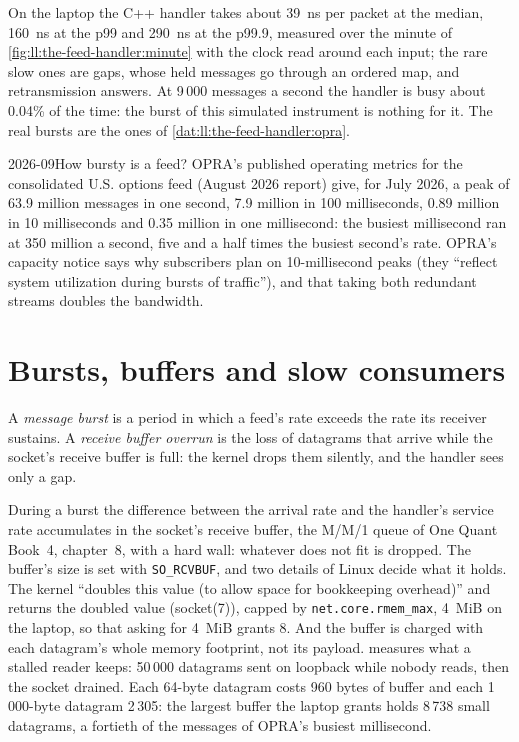On the laptop the C++ handler takes about \qty{39}{\nano\second} per packet at the median, \qty{160}{\nano\second} at the p99
and \qty{290}{\nano\second} at the p99.9, measured over the minute of \cref{fig:ll:the-feed-handler:minute} with the clock read
around each input; the rare slow ones are gaps, whose held messages go through an ordered map, and retransmission answers.
At 9\,000 messages a second the handler is busy about 0.04\% of the time: the burst of this simulated instrument is nothing
for it. The real bursts are the ones of \cref{dat:ll:the-feed-handler:opra}.

\begin{dated}{2026-09}{How bursty is a feed?}\label{dat:ll:the-feed-handler:opra}
OPRA's published operating metrics for the consolidated U.S. options feed (August 2026 report) give, for July 2026, a peak of
63.9 million messages in one second, 7.9 million in 100 milliseconds, 0.89 million in 10 milliseconds and 0.35 million in
one millisecond: the busiest millisecond ran at 350 million a second, five and a half times the busiest second's rate. OPRA's capacity
notice says why subscribers plan on 10-millisecond peaks (they ``reflect system utilization during bursts of traffic''), and
that taking both redundant streams doubles the bandwidth.
\end{dated}

\section{Bursts, buffers and slow consumers}

\begin{definition}\label{def:ll:the-feed-handler:burst}
A \emph{message burst} is a period in which a feed's rate exceeds the rate its receiver sustains. A
\emph{receive buffer overrun} is the loss of datagrams that arrive while the socket's receive
buffer is full: the kernel drops them silently, and the handler sees only a gap.
\end{definition}

During a burst the difference between the arrival rate and the handler's service rate accumulates in the socket's receive
buffer, the M/M/1 queue of One Quant Book~4, chapter~8, with a hard wall: whatever does not fit is dropped. The buffer's
size is set with \texttt{SO\_RCVBUF}, and two details of Linux decide what it holds. The kernel ``doubles this value (to
allow space for bookkeeping overhead)'' and returns the doubled value (socket(7)), capped by \texttt{net.core.rmem\_max},
4~MiB on the laptop, so that asking for 4~MiB grants 8. And the buffer is charged with each datagram's whole memory footprint,
not its payload.  measures what a stalled reader keeps: 50\,000 datagrams sent on
loopback while nobody reads, then the socket drained. Each 64-byte datagram costs 960 bytes of buffer and each 1\,000-byte
datagram 2\,305: the largest buffer the laptop grants holds 8\,738 small datagrams, a fortieth of the messages of OPRA's
busiest millisecond.

